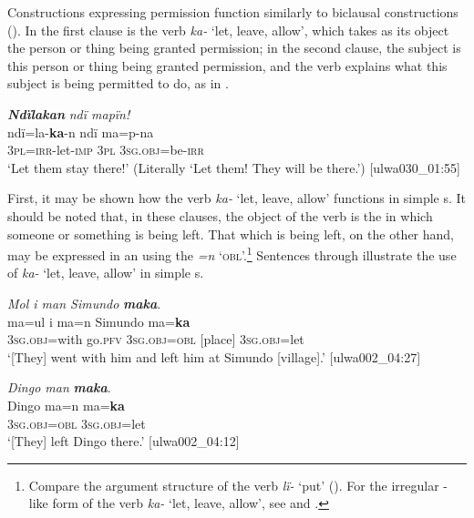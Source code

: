 Constructions expressing permission function similarly to  biclausal  constructions (). In the first clause is the verb \textit{ka-} ‘let, leave, allow’, which takes as its object the person or thing being granted permission; in the second clause, the subject is this person or thing being granted permission, and the verb explains what this subject is being permitted to do, as in .

\ea%
    \label{ex:syntax:374}
          \textbf{\textit{Ndïlakan}} \textit{ndï mapïn!}\\
\gll    ndï=la-\textbf{ka}-n    ndï  ma=p-na\\
    3\textsc{pl}=\textsc{irr-}let-\textsc{imp}  3\textsc{pl}  3\textsc{sg.obj}=be-\textsc{irr}\\
\glt `Let them stay there!’ (Literally ‘Let them! They will be there.’) [ulwa030\_01:55]
\z

  First, it may be shown how the verb \textit{ka-} ‘let, leave, allow’ functions in simple s. It should be noted that, in these clauses, the object of the verb is the  in which someone or something is being left. That which is being left, on the other hand, may be expressed in an   using the  \textit{=n} ‘\textsc{obl}’.\footnote{Compare the argument structure of the verb \textit{lï-} ‘put’ (). For the irregular -like  form of the verb \textit{ka-} ‘let, leave, allow’, see  and .} Sentences  through  illustrate the use of \textit{ka-} ‘let, leave, allow’ in simple s.

\ea%
    \label{ex:syntax:368}
        \textit{Mol i man Simundo} \textbf{\textit{maka}}.\\
\gll ma=ul      i    ma=n      Simundo  ma=\textbf{ka}\\
    3\textsc{sg.obj}=with  go.\textsc{pfv}  3\textsc{sg.obj=obl}  [place]    \textsc{3sg.obj}=let\\
\glt `[They] went with him and left him at Simundo [village].’ [ulwa002\_04:27]
\z

\ea%
    \label{ex:syntax:369}
          \textit{Dingo man} \textbf{\textit{maka}}.\\
\gll Dingo  ma=n      ma=\textbf{ka}\\
    [name]  3\textsc{sg.obj=obl}  3\textsc{sg.obj}=let\\
\glt `[They] left Dingo there.’ [ulwa002\_04:12]
\z

